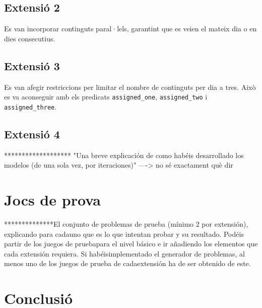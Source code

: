 \documentclass[a4paper]{article}
\begin{document}
	\subsection{Extensió 2}
	Es van incorporar continguts paral·lels, garantint que es veien el mateix dia o en dies consecutius.
	
	\subsection{Extensió 3}
	Es van afegir restriccions per limitar el nombre de continguts per dia a tres. Això es va aconseguir amb els predicats \texttt{assigned\_one}, \texttt{assigned\_two} i \texttt{assigned\_three}.
	
	\subsection{Extensió 4}
	
	
	
	******************* "Una breve explicación de como habéis desarrollado los modelos (de una sola vez, por iteraciones)" ----> no sé exactament què dir 
	
	
	\newpage
	\section{Jocs de prova}
	**************El conjunto de problemas de prueba (mínimo 2 por extensión), explicando para cadauno que es lo que intentan probar y su resultado. Podéis partir de los juegos de pruebapara el nivel básico e ir añadiendo los elementos que cada extensión requiera. Si habéisimplementado el generador de problemas, al menos uno de los juegos de prueba de cadaextensión ha de ser obtenido de este.
	
	
	\newpage
	\section{Conclusió}
	
	
\end{document}

